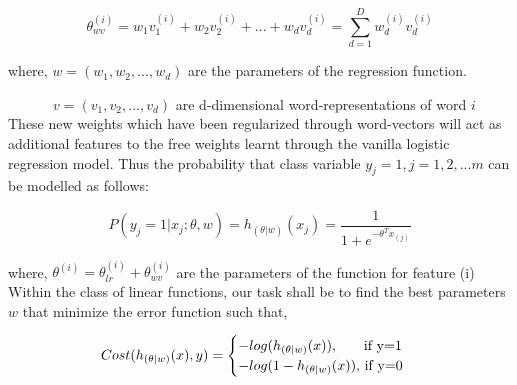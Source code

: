 \begin{equation}
\theta_{wv}^{(i)} = w_{1}v_{1}^{(i)} + w_{2}v_{2}^{(i)} + ... + w_{d}v_{d}^{(i)} = \sum_{d=1}^{D} w_{d}^{(i)}v_{d}^{(i)}
\end{equation}

where, $w = (w_{1}, w_{2}, ..., w_{d})$ are the parameters of the regression function. 

$\quad\qquad\  v= (v_{1}, v_{2}, ..., v_{d})$ are d-dimensional word-representations of word $i$\\

\noindent These new weights which have been regularized through word-vectors will act as additional features to the free weights learnt through the vanilla logistic regression model. Thus the probability that class variable $y_{j}=1, j=1,2,...m$ can be modelled as follows:

\begin{equation}
P(y_{j} = 1 | x_{j}; \theta, w) = h_{(\theta| w)}(x_{j}) = \frac{1}{1+e^{-\theta^{T}x_{(j)}}}
\end{equation}

where, $\theta^{(i)} = \theta_{lr}^{(i)} + \theta_{wv}^{(i)}$ are the parameters of the function for feature (i)\\

\noindent Within the class of linear functions, our task shall be to find the best parameters $w$ that minimize the error function such that,

\begin{equation}\label{cost_fn_eq}
Cost(h_{(\theta| w)}(x), y) = 
\begin{cases}
-log(h_{(\theta| w)}(x)), $\qquad if y=1$
\\
-log(1-h_{(\theta| w)}(x)), $ if y=0$
\end{cases}
\end{equation}\\


